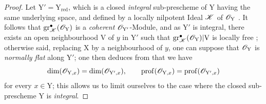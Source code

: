 \begin{proof}
Let $\mathrm{Y}'=\mathrm{Y}_\mathrm{red}$, which is a closed \emph{integral} sub-prescheme of $\mathrm{Y}$ having the same underlying space, and defined by a locally nilpotent Ideal $\mathscr{K}$ of $\mathscr{O}_\mathrm{Y}$ . It follows that $\operatorname{gr}^{\bullet}_{\mathscr{K}}(\mathscr{O}_\mathrm{Y})$ is a \emph{coherent} $\mathscr{O}_{\mathrm{Y}'}$-Module, and as $\mathrm{Y}'$ is integral, there exists an open neighbourhood $\mathrm{V}$ of $y$ in $\mathrm{Y}'$ such that $\operatorname{gr}^{\bullet}_{\mathscr{K}}(\mathscr{O}_\mathrm{Y})|\mathrm{V}$ is locally free ; otherwise said, replacing $\mathrm{X}$ by a neighbourhood of $y$, one can suppose that $\mathscr{O}_\mathrm{Y}$ is \emph{normally flat} along $\mathrm{Y}'$; one then deduces from  that we have
\[
\dim(\mathscr{O}_{\mathrm{Y},x})=\dim(\mathscr{O}_{\mathrm{Y}',x}),\qquad \operatorname{prof}(\mathscr{O}_{\mathrm{Y},x})=\operatorname{prof}(\mathscr{O}_{\mathrm{Y}',x})
\]
for every $x\in\mathrm{Y}$; this allows us to limit ourselves to the case where the closed sub-prescheme $\mathrm{Y}$ is \emph{integral}.


\end{proof}
